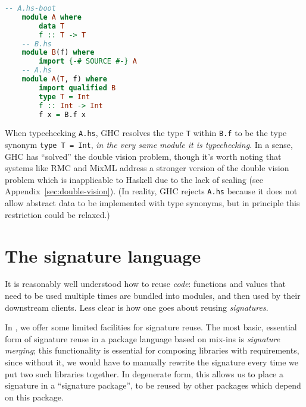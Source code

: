 \begin{lstlisting}[language=Haskell]
    -- A.hs-boot
    module A where
        data T
        f :: T -> T
    -- B.hs
    module B(f) where
        import {-# SOURCE #-} A
    -- A.hs
    module A(T, f) where
        import qualified B
        type T = Int
        f :: Int -> Int
        f x = B.f x
\end{lstlisting}
%
When typechecking \verb|A.hs|, GHC resolves the type \verb|T| within
\verb|B.f| to be the type synonym \verb|type T = Int|, \emph{in the very
same module it is typechecking}.  In a sense, GHC has ``solved'' the
double vision problem, though it's worth noting that systems like RMC
and MixML address a stronger version of the double vision problem which
is inapplicable to Haskell due to the lack of sealing (see
Appendix~\ref{sec:double-vision}).  (In reality, GHC rejects \verb|A.hs|
because it does not allow abstract data to be implemented with type
synonyms, but in principle this restriction could be relaxed.)

\section{The signature language}

It is reasonably well understood how to reuse \emph{code}: functions and
values that need to be used multiple times are bundled into modules, and then
used by their downstream clients.  Less clear is how one goes about
reusing \emph{signatures}.

In \Backpack{}, we offer some limited facilities for signature reuse.
The most basic, essential form of signature reuse in a package language
based on mix-ins is \emph{signature merging}; this functionality is
essential for composing libraries with requirements, since without it,
we would have to manually rewrite the signature every time we put two
such libraries together.  In degenerate form, this allows us to place a
signature in a ``signature package'', to be reused by other packages
which depend on this package.
